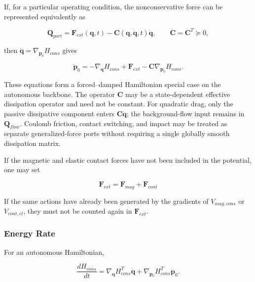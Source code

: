 If, for a particular operating condition, the nonconservative force can be represented equivalently as

\begin{equation}
\label{eq:hamiltonian-3-33}
\mathbf{Q}_{port} = \mathbf{F}_{ext}\left( \mathbf{q},t \right) - \mathbf{C}\left( \mathbf{q},\dot{\mathbf{q}},t \right)\dot{\mathbf{q}},\quad\quad\mathbf{C} = \mathbf{C}^{T} \succcurlyeq 0,
\end{equation}

then \(\dot{\mathbf{q}}=\nabla_{\mathbf{p}_{0}}H_{cons}\) gives

\begin{equation}
\label{eq:hamiltonian-3-34}
\boxed{{\dot{\mathbf{p}}}_{0} = - \nabla_{\mathbf{q}}H_{cons} + \mathbf{F}_{ext} - \mathbf{C}\nabla_{\mathbf{p}_{0}}H_{cons}.}
\end{equation}

These equations form a forced--damped Hamiltonian special case on the autonomous backbone. The operator \(\mathbf{C}\) may be a state-dependent effective dissipation operator and need not be constant. For quadratic drag, only the passive dissipative component enters \(\mathbf{C}\dot{\mathbf{q}}\); the background-flow input remains in \(\mathbf{Q}_{flow}\). Coulomb friction, contact switching, and impact may be treated as separate generalized-force ports without requiring a single globally smooth dissipation matrix.

If the magnetic and elastic contact forces have not been included in the potential, one may set

\begin{equation}
\label{eq:hamiltonian-3-35}
\mathbf{F}_{ext} = \mathbf{F}_{mag} + \mathbf{F}_{cont}
\end{equation}

If the same actions have already been generated by the gradients of \(V_{mag,cons}\) or \(V_{cont,el}\), they must not be counted again in \(\mathbf{F}_{ext}\).

\subsubsection{Energy Rate}\label{sec:hamiltonian-3-4-3}

For an autonomous Hamiltonian,\cite{MarsdenRatiu1999MechanicsSymmetry,Zhong2020Dissipative,Desai2021PHNN}

\begin{equation}
\label{eq:hamiltonian-3-36}
\frac{dH_{cons}}{dt} = \nabla_{\mathbf{q}}H_{cons}^{T}\dot{\mathbf{q}} + \nabla_{\mathbf{p}_{0}}H_{cons}^{T}{\dot{\mathbf{p}}}_{0}.
\end{equation}

